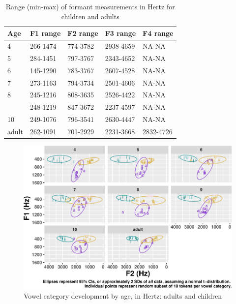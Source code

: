 \documentclass[
]{article}
\begin{document}
\begin{table}[!h]

\caption{\label{tab:formant-range-table}Range (min-max) of formant measurements in Hertz for children and adults}
\centering
\begin{tabular}[t]{lllll}
\toprule
Age & F1 range & F2 range & F3 range & F4 range\\
\midrule
4 & 266-1474 & 774-3782 & 2938-4659 & NA-NA\\
5 & 284-1451 & 797-3767 & 2343-4652 & NA-NA\\
6 & 145-1290 & 783-3767 & 2607-4528 & NA-NA\\
7 & 273-1163 & 794-3734 & 2501-4606 & NA-NA\\
8 & 245-1216 & 808-3635 & 2526-4422 & NA-NA\\
\addlinespace
9 & 248-1219 & 847-3672 & 2237-4597 & NA-NA\\
10 & 249-1076 & 796-3541 & 2630-4447 & NA-NA\\
adult & 262-1091 & 701-2929 & 2231-3668 & 2832-4726\\
\bottomrule
\end{tabular}
\end{table}

\begin{figure}
\centering
\includegraphics{3_vtl_results_files/figure-latex/hz-rawdata-plot-1.pdf}
\caption{\label{fig:hz-rawdata-plot}Vowel category development by age, in Hertz: adults and children}
\end{figure}
\end{document}
